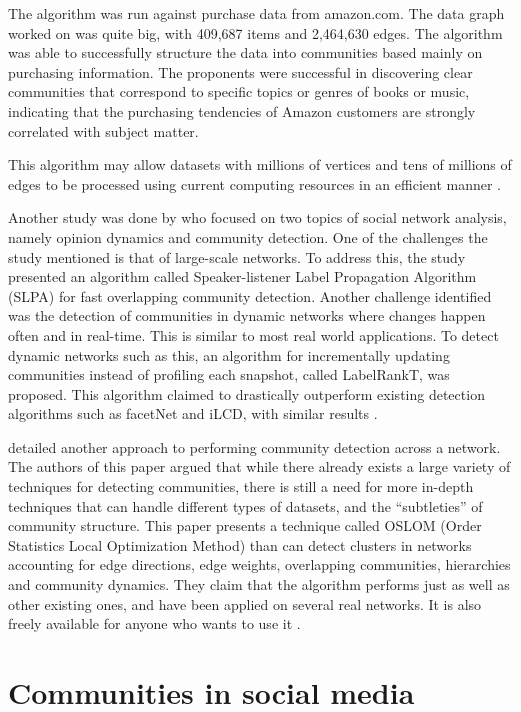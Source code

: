 The algorithm was run against purchase data from amazon.com. The data graph worked on was quite big, with 409,687 items and 2,464,630 edges. The algorithm was able to successfully structure the data into communities based mainly on purchasing information. The proponents were successful in discovering clear communities that correspond to specific topics or genres of books or music, indicating that the purchasing tendencies of Amazon customers are strongly correlated with subject matter.


This algorithm may allow datasets with millions of vertices and tens of millions of edges to be processed using current computing resources in an efficient manner \cite{Clauset:2004}.


Another study was done by  who focused on two topics of social network analysis, namely opinion dynamics and community detection. One of the challenges the study mentioned is that of large-scale networks. To address this, the study presented an algorithm called Speaker-listener Label Propagation Algorithm (SLPA) for fast overlapping community detection. Another challenge identified was the detection of communities in dynamic networks where changes happen often and in real-time. This is similar to most real world applications. To detect dynamic networks such as this, an algorithm for incrementally updating communities instead of profiling each snapshot, called LabelRankT, was proposed. This algorithm claimed to drastically outperform existing detection algorithms such as facetNet and iLCD, with similar results \cite{Xie:2012}. 


 detailed another approach to performing community detection across a network. The authors of this paper argued that while there already exists a large variety of techniques for detecting communities, there is still a need for more in-depth techniques that can handle different types of datasets, and the ``subtleties'' of community structure. This paper presents a technique called OSLOM (Order Statistics Local Optimization Method) than can detect clusters in networks accounting for edge directions, edge weights, overlapping communities, hierarchies and community dynamics. They claim that the algorithm performs just as well as other existing ones, and have been applied on several real networks. It is also freely available for anyone who wants to use it \cite{Lancichinetti:2011}.


\section{Communities in social media}


